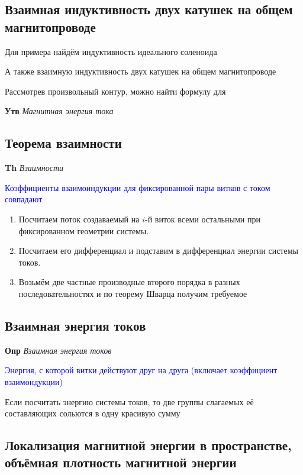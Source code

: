 \documentclass[a4paper, 14pt]{article}
\begin{document}
    \subsection{Взаимная индуктивность двух катушек на общем магнитопроводе}
    
    Для примера найдём индуктивность идеального соленоида
    
    А также взаимную индуктивность двух катушек на общем магнитопроводе
    
    Рассмотрев произвольный контур, можно найти формулу для
    
    \textbf{Утв} \textit{Магнитная энергия тока}
    
    \subsection{Теорема взаимности}
    
    \textbf{Th} \textit{Взаимности}
    
    \textcolor{blue}{Коэффициенты взаимоиндукции для фиксированной пары витков с током совпадают}
    
    \begin{enumerate}
        \item Посчитаем поток создаваемый на $i$-й виток всеми остальными при фиксированном геометрии системы.
        \item Посчитаем его дифференциал и подставим в дифференциал энергии системы токов.
        \item Возьмём две частные производные второго порядка в разных последовательностях и по теорему Шварца
        получим требуемое
    \end{enumerate}
    
    \subsection{Взаимная энергия токов}
    
    \textbf{Опр} \textit{Взаимная энергия токов}
    
    \textcolor{blue}{Энергия, с которой витки действуют друг на друга (включает коэффициент взаимондукции)}
    
    Если посчитать энергию системы токов, то две группы слагаемых её составляющих сольются в одну красивую сумму
    
    \subsection{Локализация магнитной энергии в пространстве, объёмная плотность магнитной энергии}
    
\end{document}
